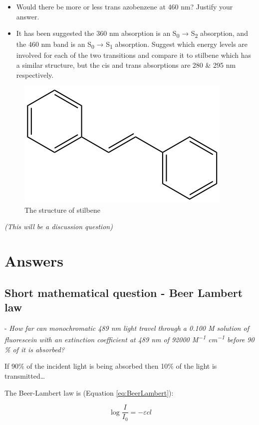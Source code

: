 \documentclass[
]{book}
\begin{document}
\begin{itemize}
\item
  Would there be more or less trans azobenzene at 460 nm? Justify your answer.
\item
  It has been suggested the 360 nm absorption is an S\textsubscript{0} → S\textsubscript{2} absorption, and the 460 nm band is an S\textsubscript{0} → S\textsubscript{1} absorption. Suggest which energy levels are involved for each of the two transitions and compare it to stilbene which has a similar structure, but the cis and trans absorptions are 280 \& 295 nm respectively.
\end{itemize}

\begin{figure}

{\centering \includegraphics[width=0.3\linewidth]{images/stilbene} 

}

\caption{The  structure of stilbene}\label{fig:stilbene}
\end{figure}

\emph{(This will be a discussion question)}

\hypertarget{sec:absans}{%
\section{Answers}\label{sec:absans}}

\hypertarget{subsec:BeerLambertans}{%
\subsection{Short mathematical question - Beer Lambert law}\label{subsec:BeerLambertans}}

- \emph{How far can monochromatic 489 nm light travel through a 0.100 M solution of fluorescein with an extinction coefficient at 489 nm of 92000 M\textsuperscript{−1} cm\textsuperscript{−1} before 90 \% of it is absorbed?}

If 90\% of the incident light is being absorbed then 10\% of the light is transmitted\ldots{}

The Beer-Lambert law is (Equation \eqref{eq:BeerLambert}):

\begin{equation}
\log{\frac{I}{I_0}}=-\varepsilon c l
\label{eq:BeerLambert}
\end{equation}
\end{document}
